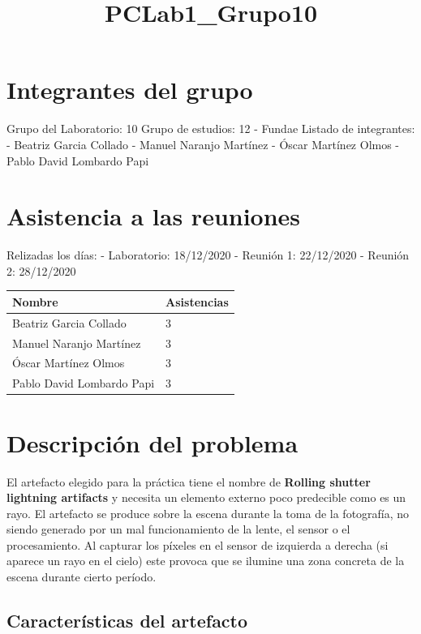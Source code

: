 \documentclass[11pt]{article}
\title{PCLab1\_Grupo10}
\begin{document}
    
    \maketitle
    
    

    
    \hypertarget{integrantes-del-grupo}{%
\section{Integrantes del grupo}\label{integrantes-del-grupo}}

Grupo del Laboratorio: 10 Grupo de estudios: 12 - Fundae Listado de
integrantes: - Beatriz Garcia Collado - Manuel Naranjo Martínez - Óscar
Martínez Olmos - Pablo David Lombardo Papi

\hypertarget{asistencia-a-las-reuniones}{%
\section{Asistencia a las reuniones}\label{asistencia-a-las-reuniones}}

Relizadas los días: - Laboratorio: 18/12/2020 - Reunión 1: 22/12/2020 -
Reunión 2: 28/12/2020

\begin{longtable}[]{@{}ll@{}}
\toprule
Nombre & Asistencias\tabularnewline
\midrule
\endhead
Beatriz Garcia Collado & 3\tabularnewline
Manuel Naranjo Martínez & 3\tabularnewline
Óscar Martínez Olmos & 3\tabularnewline
Pablo David Lombardo Papi & 3\tabularnewline
\bottomrule
\end{longtable}

\hypertarget{descripciuxf3n-del-problema}{%
\section{Descripción del problema}\label{descripciuxf3n-del-problema}}

El artefacto elegido para la práctica tiene el nombre de \textbf{Rolling
shutter lightning artifacts} y necesita un elemento externo poco
predecible como es un rayo. El artefacto se produce sobre la escena
durante la toma de la fotografía, no siendo generado por un mal
funcionamiento de la lente, el sensor o el procesamiento. Al capturar
los píxeles en el sensor de izquierda a derecha (si aparece un rayo en
el cielo) este provoca que se ilumine una zona concreta de la escena
durante cierto período.

\hypertarget{caracteruxedsticas-del-artefacto}{%
\subsection{Características del
artefacto}\label{caracteruxedsticas-del-artefacto}}
\end{document}
